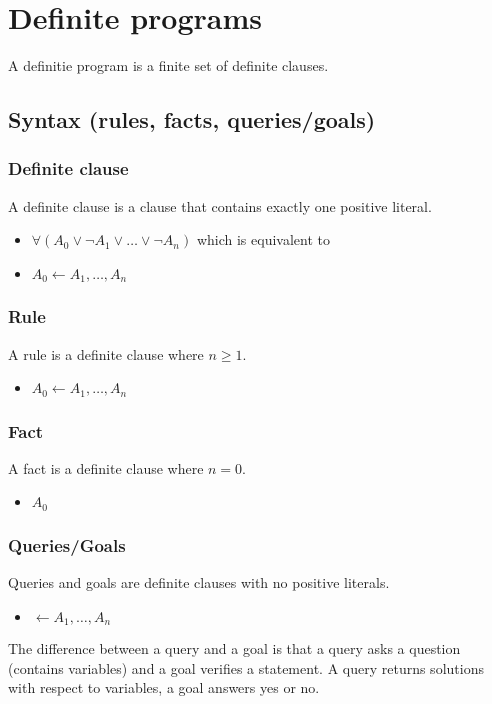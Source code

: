 \documentclass{article}
\begin{document}
\section{Definite programs}
A definitie program is a finite set of definite clauses.

\subsection{Syntax (rules, facts, queries/goals)}

\subsubsection{Definite clause}
A definite clause is a clause that contains exactly one positive literal.
\begin{itemize}
    \item $\forall(A_0\lor\lnot A_1\lor\ldots\lor\lnot A_n)$ which is equivalent to
    \item $A_0\leftarrow A_1,\ldots,A_n$
\end{itemize}

\subsubsection{Rule}
A rule is a definite clause where $n\geq1$.
\begin{itemize}
    \item $A_0\leftarrow A_1,\ldots,A_n$
\end{itemize}

\subsubsection{Fact}
A fact is a definite clause where $n = 0$.
\begin{itemize}
    \item $A_0$
\end{itemize}

\subsubsection{Queries/Goals}
Queries and goals are definite clauses with no positive literals.
\begin{itemize}
    \item $\leftarrow A_1,\ldots,A_n$
\end{itemize}
The difference between a query and a goal is that a query asks a question (contains variables) and a goal verifies a statement. A query returns solutions with respect to variables, a goal answers yes or no.
\end{document}
